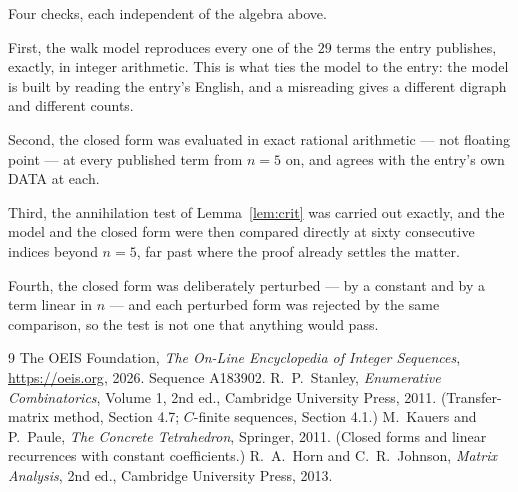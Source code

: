 \documentclass[11pt,a4paper]{article}
\theoremstyle{plain}
\theoremstyle{definition}
\begin{document}
Four checks, each independent of the algebra above.

First, the walk model reproduces every one of the $29$ terms the entry publishes,
exactly, in integer arithmetic. This is what ties the model to the entry: the model is built
by reading the entry's English, and a misreading gives a different digraph and different
counts.

Second, the closed form was evaluated in exact rational arithmetic --- not floating point ---
at every published term from $n=5$ on, and agrees with the entry's own DATA at each.

Third, the annihilation test of Lemma~\ref{lem:crit} was carried out exactly, and the model
and the closed form were then compared directly at sixty consecutive indices beyond
$n=5$, far past where the proof already settles the matter.

Fourth, the closed form was deliberately perturbed --- by a constant and by a term linear in
$n$ --- and each perturbed form was rejected by the same comparison, so the test is not one
that anything would pass.

\begin{thebibliography}{9}
 The OEIS Foundation, \emph{The On-Line Encyclopedia of Integer
Sequences}, \url{https://oeis.org}, 2026. Sequence A183902.
 R.~P.~Stanley, \emph{Enumerative Combinatorics}, Volume 1, 2nd ed.,
Cambridge University Press, 2011. (Transfer-matrix method, Section 4.7; $C$-finite sequences,
Section 4.1.)
 M.~Kauers and P.~Paule, \emph{The Concrete Tetrahedron}, Springer, 2011.
(Closed forms and linear recurrences with constant coefficients.)
 R.~A.~Horn and C.~R.~Johnson, \emph{Matrix Analysis}, 2nd ed., Cambridge
University Press, 2013.
\end{thebibliography}
\end{document}
